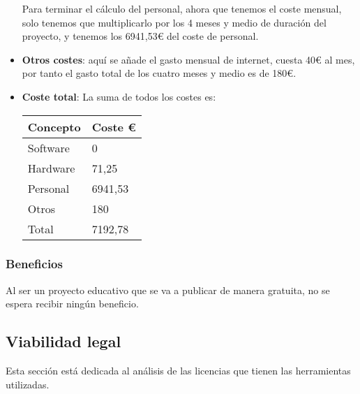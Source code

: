 \begin{itemize}
    Para terminar el cálculo del personal, ahora que tenemos el coste mensual, solo tenemos que multiplicarlo por los 4 meses y medio de duración del proyecto, y tenemos los 6941,53€ del coste de personal.

    
    \item \textbf{Otros costes}: aquí se añade el gasto mensual de internet,  cuesta 40€ al mes, por tanto el gasto total de los cuatro meses y medio  es de 180€.
    
    \item \textbf{Coste total}: La suma de todos los costes es:
    
    \begin{table}[H]
    	\begin{center}
    		\begin{tabular}{ll}
    			\hline
    			Concepto        & Coste € \\ \hline
    			Software        & 0      \\
    			Hardware        & 71,25    \\
    			Personal        & 6941,53        \\
    			Otros          & 180       \\\hline
    		    Total           & 7192,78  
    		\end{tabular}
    	\end{center}
    \end{table}
\end{itemize}
\subsubsection{Beneficios}
Al ser un proyecto educativo que se va a publicar de manera gratuita, no se espera recibir ningún beneficio.
\subsection{Viabilidad legal}
Esta sección está dedicada al análisis de las licencias que tienen las herramientas utilizadas.

